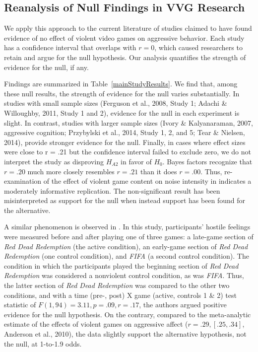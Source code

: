\documentclass[man]{apa6}
\begin{document}
\subsection{Reanalysis of Null Findings in VVG Research}
We apply this approach to the current literature of studies claimed to have found evidence of no effect of violent video games on aggressive behavior. Each study has a confidence interval that overlaps with $r = 0$, which caused researchers to retain and argue for the null hypothesis. Our analysis quantifies the strength of evidence for the null, if any.

Findings are summarized in Table~\ref{mainStudyResults}. We find that, among these null results, the strength of evidence for the null varies substantially. In studies with small sample sizes (Ferguson et al., 2008, Study 1; Adachi \& Willoughby, 2011, Study 1 and 2), evidence for the null in each experiment is slight. 
In contrast, studies with larger sample sizes (Ivory \& Kalyanaraman, 2007, aggressive cognition; Przybylski et al., 2014, Study 1, 2, and 5; Tear \& Nielsen, 2014), \nocite{Ivory:Kalyanaraman:2007;Przybylski:etal:2014;Tear:Nielsen:2014} provide stronger evidence for the null.	Finally, in cases where effect sizes were close to r = .21 but the confidence interval failed to exclude zero, we do not interpret the study as disproving $H_{A2}$ in favor of $H_0$. Bayes factors recognize that $r = .20$ much more closely resembles $r = .21$ than it does $r = .00$. Thus, re-examination of the effect of violent game content on noise intensity in \citet{Elson:etal:2013} indicates a moderately informative replication. The non-significant result has been misinterpreted as support for the null when instead support has been found for the alternative.

A similar phenomenon is observed in \citet{Valadez:Ferguson:2012}. In this study, participants' hostile feelings were measured before and after playing one of three games: a late-game section of {\em Red Dead Redemption} (the active condition), an early-game section of {\em Red Dead Redemption} (one control condition), and {\em FIFA} (a second control condition). The condition in which the participants played the beginning section of {\em Red Dead Redemption} was considered a nonviolent control condition, as was {\em FIFA}. Thus, the latter section of {\em Red Dead Redemption} was compared to the other two conditions, and with a time (pre-, post) X game (active, controls 1 \& 2) test statistic of $F(1, 94) = 3.11, p = .09, r = .17$, the authors argued positive evidence for the null hypothesis. On the contrary, compared to the meta-analytic estimate of the effects of violent games on aggressive affect ($r = .29, [.25, .34]$, Anderson et al., 2010), the data slightly support the alternative hypothesis, not the null, at 1-to-1.9 odds. 
\end{document}
